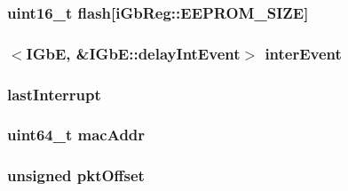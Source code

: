 \label{classIGbE_aa17c871ae2de13303ab07a8e8b571965}
\hypertarget{classIGbE_a7a8d29882b2cc202e8f3d9f4e758937c}{
\subsubsection[{flash}]{\setlength{\rightskip}{0pt plus 5cm}uint16\_\-t {\bf flash}\mbox{[}{\bf iGbReg::EEPROM\_\-SIZE}\mbox{]}}}
\label{classIGbE_a7a8d29882b2cc202e8f3d9f4e758937c}
\hypertarget{classIGbE_a3de27cfe33d0ae9f9451c767ee40a57d}{
\subsubsection[{interEvent}]{$<${\bf IGbE}, \&IGbE::delayIntEvent$>$ {\bf interEvent}}}
\label{classIGbE_a3de27cfe33d0ae9f9451c767ee40a57d}
\hypertarget{classIGbE_adad52012a21d414368149556f2cc909b}{
\subsubsection[{lastInterrupt}]{ {\bf lastInterrupt}}}
\label{classIGbE_adad52012a21d414368149556f2cc909b}
\hypertarget{classIGbE_ab70964077d0446a01beedcfb7b9f64da}{
\subsubsection[{macAddr}]{\setlength{\rightskip}{0pt plus 5cm}uint64\_\-t {\bf macAddr}}}
\label{classIGbE_ab70964077d0446a01beedcfb7b9f64da}
\hypertarget{classIGbE_a41fd0002dbd12f7ab760e7f0a6620953}{
\subsubsection[{pktOffset}]{\setlength{\rightskip}{0pt plus 5cm}unsigned {\bf pktOffset}}}
